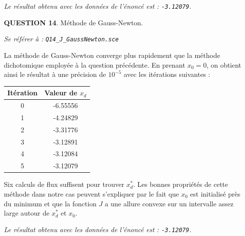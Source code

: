 \documentclass[a4paper,11pt]{article}
\newcommand{\quest}[1]{\small\textbf{#1}\normalsize}
\theoremstyle{nonumberplain}
\theoremstyle{nonumberplain}
\theoremstyle{nonumberplain}
\begin{document}
    \vspace{-2ex}
    \begin{calculs}
        \emph{Le résultat obtenu avec les données de l'énoncé est : \texttt{-3.12079}.}
    \end{calculs}

    \medskip
    \bigskip
    \quest{QUESTION 14}. Méthode de Gauss-Newton.
    \begin{ref_scilab}
        \emph{Se référer à :} \texttt{\emph{Q14\_J\_GaussNewton.sce}}
    \end{ref_scilab}

    La méthode de Gauss-Newton converge plus rapidement que la méthode dichotomique
    employée à la question précédente. En prenant $x_0 = 0$, on obtient ainsi le résultat
    à une précision de $10^{-5}$ avec les itérations suivantes :

    \begin{center}
        \begin{tabular}{|c|c|}
            \hline
            Itération & Valeur de $x_d$ \\
            \hline
            0 & \hspace{8ex}-6.55556\hspace{8ex} \\
            \hline
            1 & \hspace{8ex}-4.24829\hspace{8ex} \\
            \hline
            2 & \hspace{8ex}-3.31776\hspace{8ex} \\
            \hline
            3 & \hspace{8ex}-3.12891\hspace{8ex} \\
            \hline
            4 & \hspace{8ex}-3.12084\hspace{8ex} \\
            \hline
            5 & \hspace{8ex}-3.12079\hspace{8ex} \\
            \hline
        \end{tabular}
    \end{center}

    Six calculs de flux suffisent pour trouver $x_d^{*}$.
    Les bonnes propriétés de cette méthode dans notre
    cas peuvent s'expliquer par le fait que $x_0$ est initialisé près du minimum et
    que la fonction $J$ a une allure convexe sur un intervalle
    assez large autour de $x_d^{*}$ et $x_0$.

    \begin{calculs}
        \emph{Le résultat obtenu avec les données de l'énoncé est : \texttt{-3.12079}.}
    \end{calculs}
\end{document}
